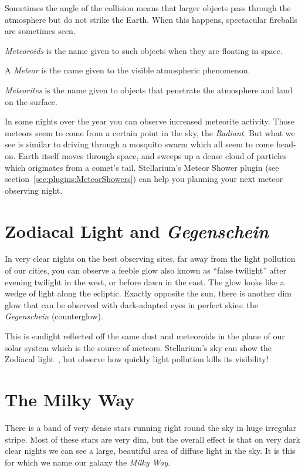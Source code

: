 Sometimes the angle of the collision means that larger objects pass
through the atmosphere but do not strike the Earth. When this happens,
spectacular fireballs are sometimes seen.

\emph{Meteoroids} is the name given to such objects when they are
floating in space.

A \emph{Meteor} is the name given to the visible atmospheric phenomenon.

\emph{Meteorites} is the name given to objects that penetrate the
atmosphere and land on the surface.

In some nights over the year you can observe increased meteorite
activity. Those meteors seem to come from a certain point in the sky,
the \emph{Radiant}. But what we see is similar to driving through a
mosquito swarm which all seem to come head-on. Earth itself moves
through space, and sweeps up a dense cloud of particles which
originates from a comet's tail. Stellarium's Meteor Shower plugin (see
section~\ref{sec:plugins:MeteorShowers}) can help you planning your next
meteor observing night.

\section{Zodiacal Light and \emph{Gegenschein}}
\label{sec:Phenomena:ZodiacalLight}

In very clear nights on the best observing sites, far away from the
light pollution of our cities, you can observe a feeble glow also
known as ``false twilight'' after evening twilight in the west, or
before dawn in the east. The glow looks like a wedge of light along
the ecliptic. Exactly opposite the sun, there is another dim glow that
can be observed with dark-adapted eyes in perfect skies: the
\emph{Gegenschein} (counterglow). 

This is sunlight reflected off the same dust and meteoroids in the
plane of our solar system which is the source of meteors. Stellarium's
sky can show the Zodiacal light~\cite{Kwon:2004:ZodiacalLight}, but
observe how quickly light pollution kills its visibility!


\section{The Milky Way}
\label{sec:Phenomena:MilkyWay}

There is a band of very dense stars running right round the sky in huge
irregular stripe. Most of these stars are very dim, but the overall
effect is that on very dark clear nights we can see a large, beautiful
area of diffuse light in the sky. It is this for which we name our
galaxy the \emph{Milky Way}.

